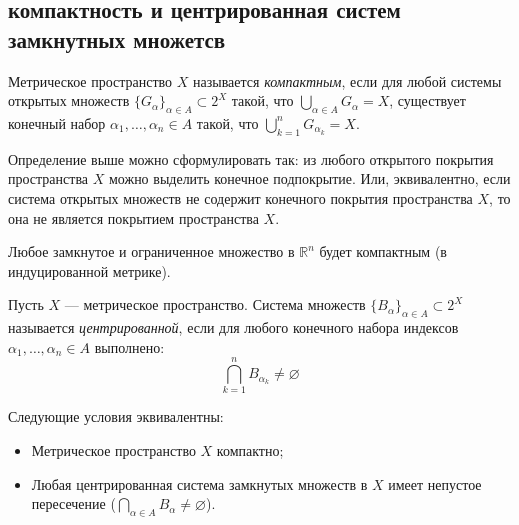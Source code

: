 \subsection{компактность и центрированная систем замкнутных множетсв}
\begin{definition}
	Метрическое пространство $X$ называется \textit{компактным}, если для любой системы открытых множеств $\{G_\alpha\}_{\alpha \in A} \subset 2^X$ такой, что $\bigcup\limits_{\alpha \in A} G_\alpha = X$, существует конечный набор $\alpha_1, \dotsc, \alpha_n \in A$ такой, что $\bigcup\limits_{k = 1}^n G_{\alpha_k} = X$.
\end{definition}

\begin{remark}
	Определение выше можно сформулировать так: из любого открытого покрытия пространства $X$ можно выделить конечное подпокрытие. Или, эквивалентно, если система открытых множеств не содержит конечного покрытия пространства $X$, то она не является покрытием пространства $X$.
\end{remark}

\begin{example}
	Любое замкнутое и ограниченное множество в $\mathbb{R}^n$ будет компактным (в индуцированной метрике).
\end{example}

\begin{definition}\label{center-system}
	Пусть $X$ --- метрическое пространство. Система множеств $\{B_\alpha\}_{\alpha \in A} \subset 2^X$ называется \textit{центрированной}, если для любого конечного набора индексов $\alpha_1, \dotsc, \alpha_n \in A$ выполнено:
	\[ \bigcap\limits_{k = 1}^n B_{\alpha_k} \neq \varnothing \]
\end{definition}



\begin{theorem}\label{thm3.1}
	Следующие условия эквивалентны:
	\begin{itemize}
		\item Метрическое пространство $X$ компактно;
		\item Любая центрированная система замкнутых множеств в $X$ имеет непустое пересечение ($\bigcap_{\alpha \in A} B_\alpha \neq \varnothing$).
	\end{itemize}
\end{theorem}